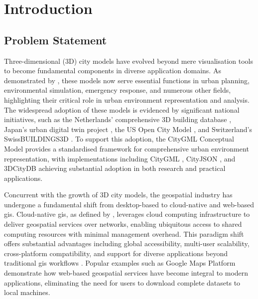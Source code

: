 
\chapter{Introduction}%
\label{introduction}

\section{Problem Statement}
\label{introduction:problem_statement}
Three-dimensional (3D) city models have evolved beyond mere visualisation tools to become fundamental components in diverse application domains.
As demonstrated by \citet{biljecki_2015}, these models now serve essential functions in urban planning, environmental simulation, emergency response, and numerous other fields, highlighting their critical role in urban environment representation and analysis.
The widespread adoption of these models is evidenced by significant national initiatives, such as the Netherlands' comprehensive 3D building database \citep{3dbag}, Japan's urban digital twin project \citep{plateau}, the US Open City Model \citep{us_buildings3d}, and Switzerland's SwissBUILDINGS3D \citep{swiss_buildings3d}.
To support this adoption, the CityGML Conceptual Model \citep{CityGML} provides a standardised framework for comprehensive urban environment representation, with implementations including CityGML \citep{CityGML}, CityJSON \citep{cityjson}, and 3DCityDB \citep{3dcitydb} achieving substantial adoption in both research and practical applications.

Concurrent with the growth of 3D city models, the geospatial industry has undergone a fundamental shift from desktop-based to cloud-native and web-based \ac{gis}.
Cloud-native \ac{gis}, as defined by \citet{nist_cloud_computing_2011}, leverages cloud computing infrastructure to deliver geospatial services over networks, enabling ubiquitous access to shared computing resources with minimal management overhead.
This paradigm shift offers substantial advantages including global accessibility, multi-user scalability, cross-platform compatibility, and support for diverse applications beyond traditional \ac{gis} workflows \citep{esri_webgis}.
Popular examples such as Google Maps Platform \citep{google_maps_platform} demonstrate how web-based geospatial services have become integral to modern applications, eliminating the need for users to download complete datasets to local machines.

